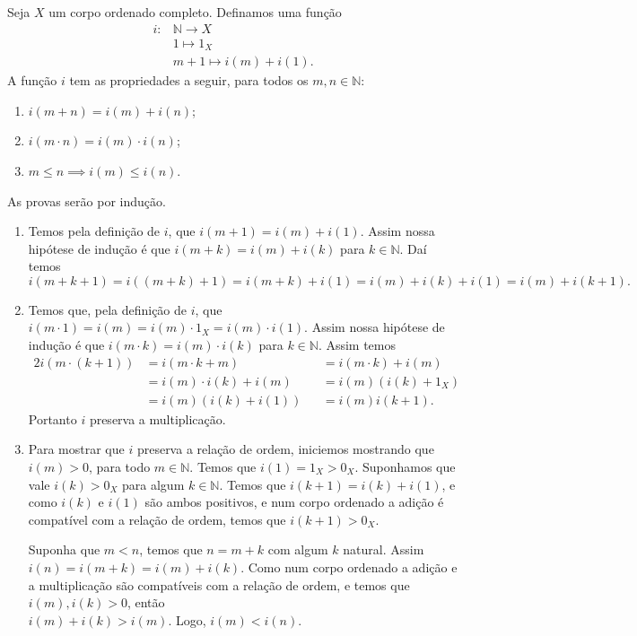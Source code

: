 \documentclass[../main.tex]{subfiles}
\begin{document}
\begin{teo}\label{enum-teo-imersaoNX}
    Seja $X$ um corpo ordenado completo.
    Definamos uma função 
    \begin{align*}
         i \colon & \mathbb{N} \to X \\
         &1 \mapsto 1_X \\
         &m+1 \mapsto i(m)+i(1).
    \end{align*}    
    A função $i$ tem as propriedades a seguir, para todos os $m,n \in \mathbb{N}$:
    \begin{enumerate}[label=(\roman*)]
        \item $i(m + n) = i(m) + i(n)$;
        \item $i(m \cdot n) = i(m) \cdot i(n)$;
        \item $m \leq n \implies i(m) \leq i(n)$.
    \end{enumerate}
\end{teo}
\begin{dem}
    As provas serão por indução.
    \begin{enumerate}[label=(\roman*)]
        \item 
        Temos pela definição de $i$, que $i(m+1) = i(m)+i(1)$. Assim nossa hipótese de indução é que $i(m+k) = i(m)+i(k)$ para $k \in \mathbb{N}$.
        Daí temos 
        \[ i(m+k+1) = i((m+k)+1) = i(m+k)+i(1) = i(m) + i(k) + i(1) = i(m) + i(k+1). \]

        \item 
        Temos que, pela definição de $i$, que $i(m \cdot 1) =i(m)= i(m) \cdot 1_X = i(m) \cdot i(1)$. Assim nossa hipótese de indução é que  
        $i(m \cdot k) = i(m) \cdot i(k)$ para  $k \in \mathbb{N}$. Assim temos 
        \begin{alignat*}{2}
            i(m \cdot (k+1)) &= i(m \cdot k + m) &&= i(m \cdot k) + i(m)  \\
            &= i(m) \cdot i(k) + i(m) &&= i(m)( i(k)+1_X ) \\
            &= i(m)(i(k)+i(1))&&=i(m)i(k+1).
        \end{alignat*}
        Portanto $i$ preserva a multiplicação.

        \item 
        Para mostrar que $i$ preserva a relação de ordem, iniciemos mostrando que $i(m) > 0$, para todo $m \in \mathbb{N}$. Temos que $i(1) = 1_X > 0_X$. Suponhamos que vale $i(k) > 0_X$ para algum $k \in \mathbb{N}$. Temos que $i(k+1) = i(k) + i(1)$, e como $i(k)$ e $i(1)$ são ambos positivos, e num corpo ordenado a adição é compatível com a relação de ordem, temos que $i(k+1) > 0_X$.
        
        Suponha que $m<n$, temos que $n = m+k$ com algum $k$ natural.
        Assim \\ 
        $i(n) = i(m+k) = i(m)+i(k)$. Como num corpo ordenado a adição e a multiplicação são compatíveis com a relação de ordem, e temos que $i(m),i(k) > 0$, então \\ 
        $i(m)+i(k) > i(m)$. Logo, $i(m) < i(n)$.
        
    \end{enumerate}
\end{dem}
\end{document}
